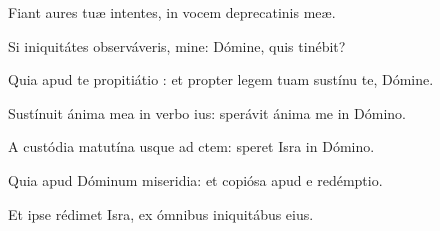 \item {}

\item Fiant aures tuæ intentes,\psstar{} in vocem deprecatinis meæ.

\item Si iniquitátes observáveris, mine:\psstar{} Dómine, quis tinébit?

\item Quia apud te propitiátio :\psstar{} et propter legem tuam sustínu te, Dómine.

\item Sustínuit ánima mea in verbo ius:\psstar{} sperávit ánima me in Dómino.

\item A custódia matutína usque ad ctem:\psstar{} speret Isra in Dómino.

\item Quia apud Dóminum miseridia:\psstar{} et copiósa apud e redémptio.

\item Et ipse rédimet Isra,\psstar{} ex ómnibus iniquitábus eius.
